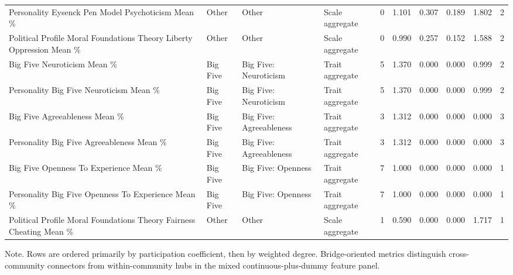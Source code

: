 \begin{table}[htbp]
\begin{threeparttable}
\begin{adjustbox}{max width=\linewidth}
\begin{tabular}{llllrrrrrr}
Personality Eysenck Pen Model Psychoticism Mean \% & Other & Other & Scale aggregate & 0 & 1.101 & 0.307 & 0.189 & 1.802 & 2 \\
Political Profile Moral Foundations Theory Liberty Oppression Mean \% & Other & Other & Scale aggregate & 0 & 0.990 & 0.257 & 0.152 & 1.588 & 2 \\
Big Five Neuroticism Mean \% & Big Five & Big Five: Neuroticism & Trait aggregate & 5 & 1.370 & 0.000 & 0.000 & 0.999 & 2 \\
Personality Big Five Neuroticism Mean \% & Big Five & Big Five: Neuroticism & Trait aggregate & 5 & 1.370 & 0.000 & 0.000 & 0.999 & 2 \\
Big Five Agreeableness Mean \% & Big Five & Big Five: Agreeableness & Trait aggregate & 3 & 1.312 & 0.000 & 0.000 & 0.000 & 3 \\
Personality Big Five Agreeableness Mean \% & Big Five & Big Five: Agreeableness & Trait aggregate & 3 & 1.312 & 0.000 & 0.000 & 0.000 & 3 \\
Big Five Openness To Experience Mean \% & Big Five & Big Five: Openness & Trait aggregate & 7 & 1.000 & 0.000 & 0.000 & 0.000 & 1 \\
Personality Big Five Openness To Experience Mean \% & Big Five & Big Five: Openness & Trait aggregate & 7 & 1.000 & 0.000 & 0.000 & 0.000 & 1 \\
Political Profile Moral Foundations Theory Fairness Cheating Mean \% & Other & Other & Scale aggregate & 1 & 0.590 & 0.000 & 0.000 & 1.717 & 1 \\
\bottomrule
\end{tabular}
\end{adjustbox}
\begin{tablenotes}[flushleft]
\footnotesize
\item Note. Rows are ordered primarily by participation coefficient, then by weighted degree. Bridge-oriented metrics distinguish cross-community connectors from within-community hubs in the mixed continuous-plus-dummy feature panel.
\end{tablenotes}
\end{threeparttable}
\end{table}